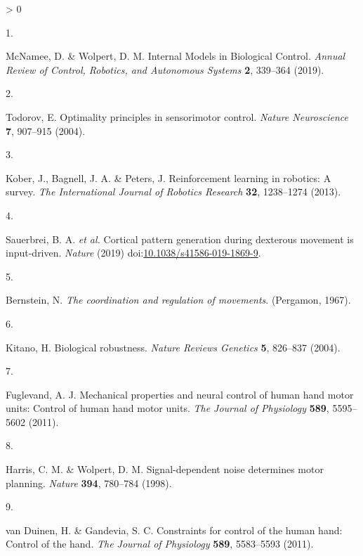 \documentclass[
  a4paper,
]{article}
\newlength{\cslhangindent}
\newlength{\csllabelwidth}
\newenvironment{CSLReferences}[2] %
 {%
  \setlength{\parindent}{0pt}
  \ifodd #1 \everypar{\setlength{\hangindent}{\cslhangindent}}\ignorespaces\fi
  \ifnum #2 > 0
  \setlength{\parskip}{#2\baselineskip}
  \fi
 }%
 {}
\newcommand{\CSLLeftMargin}[1]{\parbox[t]{\csllabelwidth}{#1}}
\newcommand{\CSLRightInline}[1]{\parbox[t]{\linewidth - \csllabelwidth}{#1}\break}
\begin{document}
\hypertarget{refs}{}
\begin{CSLReferences}{0}{0}
\leavevmode\hypertarget{ref-McNamee2019}{}%
\CSLLeftMargin{1. }
\CSLRightInline{McNamee, D. \& Wolpert, D. M. Internal {Models} in
{Biological Control}. \emph{Annual Review of Control, Robotics, and
Autonomous Systems} \textbf{2}, 339--364 (2019).}

\leavevmode\hypertarget{ref-Todorov2004}{}%
\CSLLeftMargin{2. }
\CSLRightInline{Todorov, E. Optimality principles in sensorimotor
control. \emph{Nature Neuroscience} \textbf{7}, 907--915 (2004).}

\leavevmode\hypertarget{ref-koberReinforcementLearningRobotics2013}{}%
\CSLLeftMargin{3. }
\CSLRightInline{Kober, J., Bagnell, J. A. \& Peters, J. Reinforcement
learning in robotics: {A} survey. \emph{The International Journal of
Robotics Research} \textbf{32}, 1238--1274 (2013).}

\leavevmode\hypertarget{ref-sauerbreiCorticalPatternGeneration2019}{}%
\CSLLeftMargin{4. }
\CSLRightInline{Sauerbrei, B. A. \emph{et al.} Cortical pattern
generation during dexterous movement is input-driven. \emph{Nature}
(2019)
doi:\href{https://doi.org/10.1038/s41586-019-1869-9}{10.1038/s41586-019-1869-9}.}

\leavevmode\hypertarget{ref-Bernstein1967}{}%
\CSLLeftMargin{5. }
\CSLRightInline{Bernstein, N. \emph{The coordination and regulation of
movements}. ({Pergamon}, 1967).}

\leavevmode\hypertarget{ref-kitanoBiologicalRobustness2004}{}%
\CSLLeftMargin{6. }
\CSLRightInline{Kitano, H. Biological robustness. \emph{Nature Reviews
Genetics} \textbf{5}, 826--837 (2004).}

\leavevmode\hypertarget{ref-fuglevandMechanicalPropertiesNeural2011}{}%
\CSLLeftMargin{7. }
\CSLRightInline{Fuglevand, A. J. Mechanical properties and neural
control of human hand motor units: {Control} of human hand motor units.
\emph{The Journal of Physiology} \textbf{589}, 5595--5602 (2011).}

\leavevmode\hypertarget{ref-harrisSignaldependentNoiseDetermines1998}{}%
\CSLLeftMargin{8. }
\CSLRightInline{Harris, C. M. \& Wolpert, D. M. Signal-dependent noise
determines motor planning. \emph{Nature} \textbf{394}, 780--784 (1998).}

\leavevmode\hypertarget{ref-vanduinenConstraintsControlHuman2011}{}%
\CSLLeftMargin{9. }
\CSLRightInline{van Duinen, H. \& Gandevia, S. C. Constraints for
control of the human hand: {Control} of the hand. \emph{The Journal of
Physiology} \textbf{589}, 5583--5593 (2011).}


\end{CSLReferences}
\end{document}
